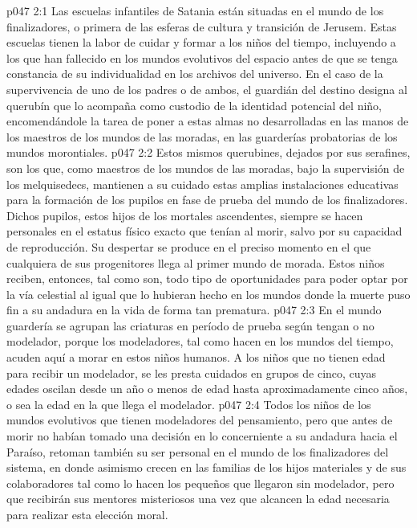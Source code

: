 \vs p047 2:1 Las escuelas infantiles de Satania están situadas en el mundo de los finalizadores, o primera de las esferas de cultura y transición de Jerusem. Estas escuelas tienen la labor de cuidar y formar a los niños del tiempo, incluyendo a los que han fallecido en los mundos evolutivos del espacio antes de que se tenga constancia de su individualidad en los archivos del universo. En el caso de la supervivencia de uno de los padres o de ambos, el guardián del destino designa al querubín que lo acompaña como custodio de la identidad potencial del niño, encomendándole la tarea de poner a estas almas no desarrolladas en las manos de los maestros de los mundos de las moradas, en las guarderías probatorias de los mundos morontiales.
\vs p047 2:2 Estos mismos querubines, dejados por sus serafines, son los que, como maestros de los mundos de las moradas, bajo la supervisión de los melquisedecs, mantienen a su cuidado estas amplias instalaciones educativas para la formación de los pupilos en fase de prueba del mundo de los finalizadores. Dichos pupilos, estos hijos de los mortales ascendentes, siempre se hacen personales en el estatus físico exacto que tenían al morir, salvo por su capacidad de reproducción. Su despertar se produce en el preciso momento en el que cualquiera de sus progenitores llega al primer mundo de morada. Estos niños reciben, entonces, tal como son, todo tipo de oportunidades para poder optar por la vía celestial al igual que lo hubieran hecho en los mundos donde la muerte puso fin a su andadura en la vida de forma tan prematura.
\vs p047 2:3 En el mundo guardería se agrupan las criaturas en período de prueba según tengan o no modelador, porque los modeladores, tal como hacen en los mundos del tiempo, acuden aquí a morar en estos niños humanos. A los niños que no tienen edad para recibir un modelador, se les presta cuidados en grupos de cinco, cuyas edades oscilan desde un año o menos de edad hasta aproximadamente cinco años, o sea la edad en la que llega el modelador.
\vs p047 2:4 Todos los niños de los mundos evolutivos que tienen modeladores del pensamiento, pero que antes de morir no habían tomado una decisión en lo concerniente a su andadura hacia el Paraíso, retoman también su ser personal en el mundo de los finalizadores del sistema, en donde asimismo crecen en las familias de los hijos materiales y de sus colaboradores tal como lo hacen los pequeños que llegaron sin modelador, pero que recibirán sus mentores misteriosos una vez que alcancen la edad necesaria para realizar esta elección moral.
